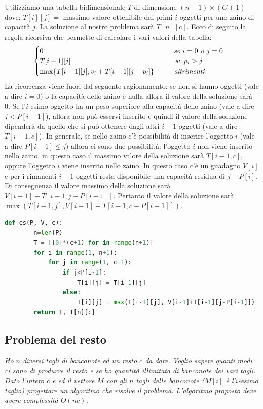 Utilizziamo una tabella bidimensionale $T$ di dimensione $(n + 1)\times (C + 1)$ dove: $T[i][j] =$ massimo valore ottenibile dai primi $i$ oggetti per uno zaino di capacità $j$. La soluzione al nostro problema sarà $T[n][c]$. Ecco di seguito la regola ricorsiva che permette di calcolare i vari valori della tabella:
\begin{equation*}
\begin{cases}
    0\hspace{6.5cm}\textit{se }i=0\textit{ o }j=0\\
    T[i-1][j]\hspace{5.2cm}\textit{se }p_i>j\\
    \max\{T[i-1][j], v_i+T[i-1][j-p_i]\}\hspace{1cm}\textit{altrimenti}
\end{cases}
\end{equation*}
La ricorrenza viene fuori dal seguente ragionamento: se non si hanno oggetti (vale a dire $i = 0$) o la capacità dello zaino è nulla allora il valore della soluzione sarà 0. Se l'$i$-esimo oggetto ha un peso superiore alla capacità dello zaino (vale a dire $j<P[i-1]$), allora non può esservi inserito e quindi il valore della soluzione dipenderà da quello che si può ottenere dagli altri $i-1$ oggetti (vale a dire $T[i-1, c]$). In generale, se nello zaino c'è possibilità di inserire l'oggetto $i$ (vale a dire $P[i - 1] \leq j$) allora ci sono due possibilità: l'oggetto $i$ non viene inserito nello zaino, in questo caso il massimo valore della soluzione sarà $T[i-1,c]$, oppure l'oggetto $i$ viene inserito nello zaino. In questo caso c'è un guadagno $V[i]$ e per i rimanenti $i-1$ oggetti resta disponibile una capacità residua di $j-P[i]$. Di conseguenza il valore massimo della soluzione sarà $V[i - 1] + T[i - 1, j - P[i - 1]]$. Pertanto il valore della soluzione sarà $\max(T[i-1,j], V[i-1]+T[i-1, c-P[i-1]])$.
\begin{lstlisting}[language=Python]
    def es(P, V, c):
        n=len(P)
        T = [[0]*(c+1) for in range(n+1)]
        for i in range(1, n+1):
            for j in range(1, c+1):
                if j<P[i-1]:
                    T[i][j] = T[i-1][j]
                else:
                    T[i][j] = max(T[i-1][j], V[i-1]+T[i-1][j-P[i-1]]) 
        return T, T[n][c]
\end{lstlisting}

\subsection{Problema del resto}
\textit{Ho $n$ diversi tagli di banconote ed un resto $c$ da dare. Voglio sapere quanti modi ci sono di produrre il resto e se ho quantità illimitata di banconote dei vari tagli. Dato l'intero $c$ e ed il vettore $M$ con gli $n$ tagli delle banconote ($M[i]$ è l'$i$-esimo taglio) progettare un algoritmo che risolve il problema. L'algoritmo proposto deve avere complessità $O(nc)$.}

